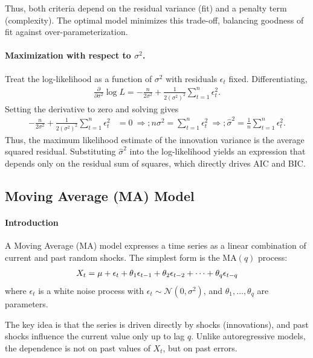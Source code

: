 \documentclass[10pt,a4paper]{article}
\begin{document}
	
	Thus, both criteria depend on the residual variance (fit) and a penalty term (complexity). The optimal model minimizes this trade-off, balancing goodness of fit against over-parameterization.
	
	\paragraph{Maximization with respect to $\sigma^2$.}
	Treat the log-likelihood as a function of $\sigma^2$ with residuals ${\epsilon_t}$ fixed. Differentiating,
	\begin{align*}
	\frac{\partial}{\partial \sigma^2} \log L
	= -\frac{n}{2\sigma^2} + \frac{1}{2(\sigma^2)^2} \sum_{t=1}^{n} \epsilon_t^2.
	\end{align*}
	Setting the derivative to zero and solving gives
	\begin{align*}
	-\frac{n}{2\sigma^2} + \frac{1}{2(\sigma^2)^2} \sum_{t=1}^{n} \epsilon_t^2 &= 0 \
	\Rightarrow ; n\sigma^2 = \sum_{t=1}^{n} \epsilon_t^2 \
	\Rightarrow ; \hat{\sigma}^2 = \frac{1}{n} \sum_{t=1}^{n} \epsilon_t^2.
	\end{align*}
	Thus, the maximum likelihood estimate of the innovation variance is the average squared residual. Substituting $\hat{\sigma}^2$ into the log-likelihood yields an expression that depends only on the residual sum of squares, which directly drives AIC and BIC.
	
	
	\subsection{Moving Average (MA) Model}
	\paragraph{Introduction}
	A Moving Average (MA) model expresses a time series as a linear combination of current and past random shocks. The simplest form is the MA$(q)$ process:
	\begin{align*}
	\large X_t = \mu + \epsilon_t + \theta_1 \epsilon_{t-1} + \theta_2 \epsilon_{t-2} + \cdots + \theta_q \epsilon_{t-q}
	\end{align*}
	where ${\epsilon_t}$ is a white noise process with $\epsilon_t \sim \mathcal{N}(0,\sigma^2)$, and $\theta_1,\dots,\theta_q$ are parameters.
	
	The key idea is that the series is driven directly by shocks (innovations), and past shocks influence the current value only up to lag $q$. Unlike autoregressive models, the dependence is not on past values of $X_t$, but on past errors.
	
\end{document}
